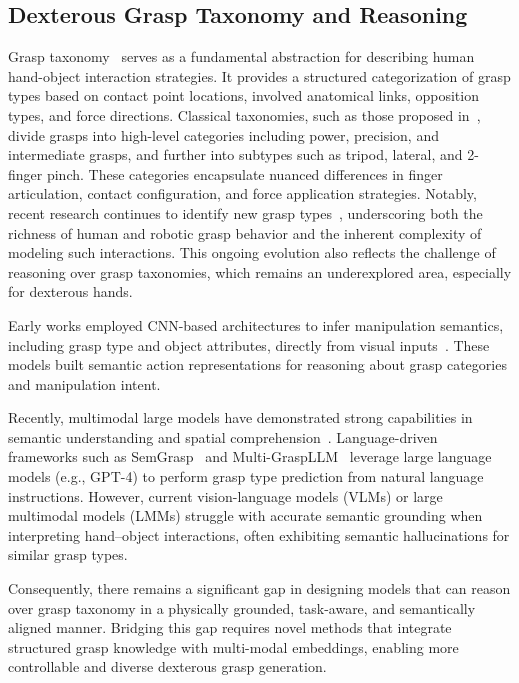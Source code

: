 \subsection{Dexterous Grasp Taxonomy and Reasoning}


Grasp taxonomy~\cite{feix2015grasp} serves as a fundamental abstraction for describing human hand-object interaction strategies. It provides a structured categorization of grasp types based on contact point locations, involved anatomical links, opposition types, and force directions. 
Classical taxonomies, such as those proposed in~\cite{feix2015grasp}, divide grasps into high-level categories including power, precision, and intermediate grasps, and further into subtypes such as tripod, lateral, and 2-finger pinch. These categories encapsulate nuanced differences in finger articulation, contact configuration, and force application strategies. Notably, recent research continues to identify new grasp types~\cite{liu2021synthesizing}, underscoring both the richness of human and robotic grasp behavior and the inherent complexity of modeling such interactions. This ongoing evolution also reflects the challenge of reasoning over grasp taxonomies, which remains an underexplored area, especially for dexterous hands.


Early works employed CNN-based architectures to infer manipulation semantics, including grasp type and object attributes, directly from visual inputs~\cite{cai2016understanding}. These models built semantic action representations for reasoning about grasp categories and manipulation intent. 



Recently, multimodal large models have demonstrated strong capabilities in semantic understanding and spatial comprehension~\cite{ni2025don,jin2024robotgpt,ji2025robobrain,li2024foundation,song2025maniplvm}. 
Language-driven frameworks such as SemGrasp~\cite{li2024semgrasp} and Multi-GraspLLM~\cite{li2024multi} leverage large language models (e.g., GPT-4) to perform grasp type prediction from natural language instructions. However, current vision-language models (VLMs) or large multimodal models (LMMs) struggle with accurate semantic grounding when interpreting hand–object interactions, often exhibiting semantic hallucinations for similar grasp types.


Consequently, there remains a significant gap in designing models that can reason over grasp taxonomy in a physically grounded, task-aware, and semantically aligned manner. Bridging this gap requires novel methods that integrate structured grasp knowledge with multi-modal embeddings, enabling more controllable and diverse dexterous grasp generation.

